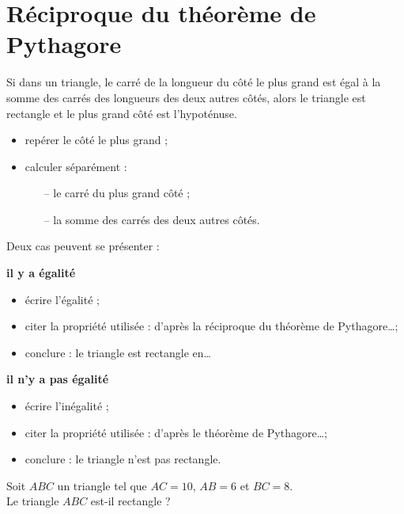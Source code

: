 \section{Réciproque du théorème de Pythagore}

\begin{propriete}
   Si dans un triangle, le carré de la longueur du côté le plus grand est égal à la somme des carrés des longueurs des deux autres côtés, alors le triangle est rectangle et le plus grand côté est l'hypoténuse.
\end{propriete}

\begin{methode*2*2}
   \begin{itemize}
      \item repérer le côté le plus grand ;
      \item calculer séparément :
      \begin{itemize}
         \item[--] le carré du plus grand côté ;
         \item[--] la somme des carrés des deux autres côtés.
      \end{itemize}
   \end{itemize}
   Deux cas peuvent se présenter : \\
   \parbox[t]{0.49\linewidth}{
   {\bf il y a égalité}
   \begin{itemize}
      \item écrire l'égalité ;
      \item citer la propriété utilisée : \og d'après la réciproque du théorème de Pythagore\dots \fg{};
      \item conclure : \og le triangle est rectangle en\dots \fg
   \end{itemize}  
}\hfill\vrule\hfill
\parbox[t]{0.49\linewidth}{
   {\bf il n'y a pas égalité}
   \begin{itemize}
      \item écrire l'inégalité ;
      \item citer la propriété utilisée : \og d'après le théorème de Pythagore\dots \fg{};
      \item conclure : \og le triangle n'est pas rectangle. \fg
   \end{itemize}}
\exercice
   Soit $ABC$ un triangle tel que $AC=10$, $AB=6$ et $BC=8$. \\
   Le triangle $ABC$ est-il rectangle ?

\end{methode*2*2}
